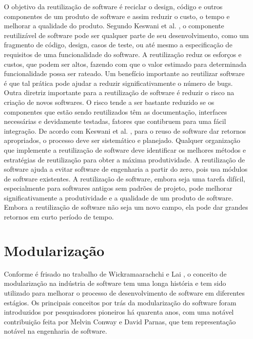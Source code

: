 O objetivo da reutilização de software é reciclar o design, código e outros componentes de um produto de software e assim reduzir o custo, o tempo e melhorar a qualidade do produto.
Segundo Keswani et al. \cite{6783445}, o componente reutilizável de software pode ser qualquer parte de seu desenvolvimento, como um fragmento de código, design, casos de teste, ou até mesmo a especificação de requisitos de uma funcionalidade do software. 
A reutilização reduz os esforços e custos, que podem ser altos, fazendo com que o valor estimado para determinada funcionalidade possa ser rateado. Um benefício importante ao reutilizar software é que tal prática pode ajudar a reduzir significativamente o número de bugs. 
Outra diretriz importante para a reutilização de software é reduzir o risco na criação de novos softwares. O risco tende a ser bastante reduzido se os componentes que estão sendo reutilizados têm as documentação, interfaces necessárias e devidamente testadas, fatores que contibruem para uma fácil integração.
De acordo com Keswani et al. \citep{6783445}, para o reuso de software dar retornos apropriados, o processo deve ser sistemático e planejado. Qualquer organização que implemente a reutilização de software deve identificar os melhores métodos e estratégias de reutilização para obter a máxima produtividade. A reutilização de software ajuda a evitar software de engenharia a partir do zero, pois usa módulos de software existentes. A reutilização de software, embora seja uma tarefa difícil, especialmente para softwares antigos sem padrões de projeto, pode melhorar significativamente a produtividade e a qualidade de um produto de software. Embora a reutilização de software não seja um novo campo, ela pode dar grandes retornos em curto período de tempo.


\section{Modularização}\label{sec:modularizacao} %


Conforme é frisado no trabalho de Wickramaarachchi e Lai \citep{7062705}, o conceito de modularização na indústria de software tem uma longa história e tem sido utilizado para melhorar o processo de desenvolvimento de software em diferentes estágios. Os principais conceitos por trás da modularização do software foram introduzidos por pesquisadores pioneiros há quarenta anos, com uma notável contribuição feita por Melvin Conway e David Parnas, que tem representação notável na engenharia de software.


